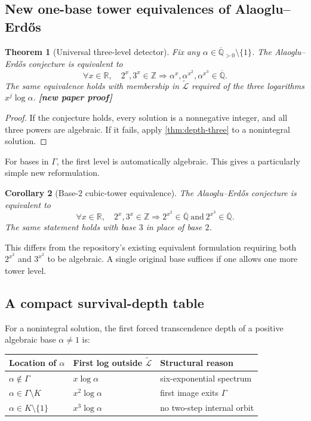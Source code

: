 \documentclass[11pt,oneside]{article}
\newtheorem{theorem}{Theorem}[section]
\newtheorem{corollary}[theorem]{Corollary}
\theoremstyle{definition}
\theoremstyle{remark}
\newcommand{\Z}{\mathbb Z}
\newcommand{\R}{\mathbb R}
\newcommand{\Qbar}{\overline{\mathbb Q}}
\newcommand{\Apos}{\overline{\mathbb Q}_{>0}}
\newcommand{\LL}{\widetilde{\mathcal L}}
\newcommand{\statusnew}{\textcolor{NewViolet}{\textbf{[new paper proof]}}}
\begin{document}
\subsection{New one-base tower equivalences of Alaoglu--Erd\H{o}s}

\begin{theorem}[Universal three-level detector]\label{thm:universal-tower-detector}
Fix any $\alpha\in\Apos\setminus\{1\}$.  The Alaoglu--Erd\H{o}s conjecture is equivalent to
\[
 \forall x\in\R,\quad
 2^x,3^x\in\Z
 \Longrightarrow
 \alpha^x,\alpha^{x^2},\alpha^{x^3}\in\Qbar.
                                                        \tag{9.1}\label{eq:three-level-detector}
\]
The same equivalence holds with membership in $\LL$ required of the three logarithms
$x^j\log\alpha$.  \statusnew
\end{theorem}

\begin{proof}
If the conjecture holds, every solution is a nonnegative integer, and all three powers are
algebraic.  If it fails, apply \cref{thm:depth-three} to a nonintegral solution.
\end{proof}

For bases in $\Gamma$, the first level is automatically algebraic.  This gives a particularly
simple new reformulation.

\begin{corollary}[Base-$2$ cubic-tower equivalence]\label{cor:base2-equivalence}
The Alaoglu--Erd\H{o}s conjecture is equivalent to
\[
 \forall x\in\R,\quad
 2^x,3^x\in\Z
 \Longrightarrow
 2^{x^2}\in\Qbar\ \text{and}\ 2^{x^3}\in\Qbar.
                                                        \tag{9.2}\label{eq:base2-cubic}
\]
The same statement holds with base $3$ in place of base $2$.
\end{corollary}

This differs from the repository's existing equivalent formulation requiring both
$2^{x^2}$ and $3^{x^2}$ to be algebraic.  A single original base suffices if one allows one
more tower level.

\subsection{A compact survival-depth table}

For a nonintegral solution, the first forced transcendence depth of a positive algebraic
base $\alpha\ne1$ is:

\begin{center}
\begin{tabular}{lll}
\toprule
Location of $\alpha$ & First log outside $\LL$ & Structural reason \\
\midrule
$\alpha\notin\Gamma$ & $x\log\alpha$ & six-exponential spectrum \\
$\alpha\in\Gamma\setminus K$ & $x^2\log\alpha$ & first image exits $\Gamma$ \\
$\alpha\in K\setminus\{1\}$ & $x^3\log\alpha$ & no two-step internal orbit \\
\bottomrule
\end{tabular}
\end{center}
\end{document}
